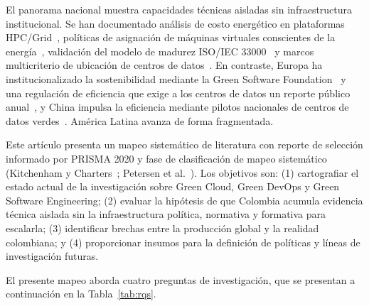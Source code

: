 \documentclass[conference]{IEEEtran}
\begin{document}
El panorama nacional muestra capacidades t\'ecnicas aisladas sin infraestructura institucional. Se han documentado an\'alisis de costo energ\'etico en plataformas HPC/Grid~\cite{hernandez2011}, pol\'iticas de asignaci\'on de m\'aquinas virtuales conscientes de la energ\'ia~\cite{diaz2013}, validaci\'on del modelo de madurez ISO/IEC 33000~\cite{paton2019} y marcos multicriterio de ubicaci\'on de centros de datos~\cite{torres2026}. En contraste, Europa ha institucionalizado la sostenibilidad mediante la Green Software Foundation~\cite{sandquist2021gsf} y una regulaci\'on de eficiencia que exige a los centros de datos un reporte p\'ublico anual~\cite{eu2023dir1791}, y China impulsa la eficiencia mediante pilotos nacionales de centros de datos verdes~\cite{wangHowCanNational2026}. Am\'erica Latina avanza de forma fragmentada.

Este art\'iculo presenta un mapeo sistem\'atico de literatura con reporte de selecci\'on informado por PRISMA 2020 y fase de clasificaci\'on de mapeo sistem\'atico (Kitchenham y Charters~\cite{kitchenham2007}; Petersen et al.~\cite{petersen2015}). Los objetivos son: (1) cartografiar el estado actual de la investigaci\'on sobre Green Cloud, Green DevOps y Green Software Engineering; (2) evaluar la hip\'otesis de que Colombia acumula evidencia t\'ecnica aislada sin la infraestructura pol\'itica, normativa y formativa para escalarla; (3) identificar brechas entre la producci\'on global y la realidad colombiana; y (4) proporcionar insumos para la definici\'on de pol\'iticas y l\'ineas de investigaci\'on futuras.

El presente mapeo aborda cuatro preguntas de investigaci\'on, que se presentan a continuaci\'on en la Tabla~\ref{tab:rqs}.
\end{document}
